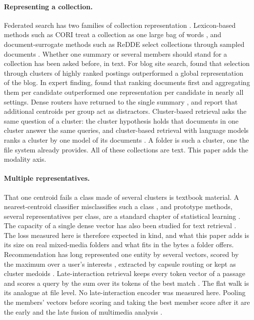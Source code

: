 \documentclass[sigconf,natbib=true,anonymous=true]{acmart}
\begin{document}
\paragraph{Representing a collection.} Federated search has two families of collection representation \citep{shokouhi2011federated}. Lexicon-based methods such as CORI treat a collection as one large bag of words \citep{callan1995cori}, and document-surrogate methods such as ReDDE select collections through sampled documents \citep{si2003redde}. Whether one summary or several members should stand for a collection has been asked before, in text. For blog site search, \citet{seo2008blogsite} found that selection through clusters of highly ranked postings outperformed a global representation of the blog. In expert finding, \citet{balog2006expert} found that ranking documents first and aggregating them per candidate outperformed one representation per candidate in nearly all settings. Dense routers have returned to the single summary \citep{dhasade2026ragroute,lee2025routerretriever}, and \citet{lee2025routerretriever} report that additional centroids per group act as distractors. Cluster-based retrieval asks the same question of a cluster: the cluster hypothesis \citep{voorhees1985cluster} holds that documents in one cluster answer the same queries, and cluster-based retrieval with language models ranks a cluster by one model of its documents \citep{liu2004cluster,kurland2004corpus}. A folder is such a cluster, one the file system already provides. All of these collections are text. This paper adds the modality axis.

\paragraph{Multiple representatives.} That one centroid fails a class made of several clusters is textbook material. A nearest-centroid classifier misclassifies such a class \citep{manning2008iir}, and prototype methods, several representatives per class, are a standard chapter of statistical learning \citep{hastie2009esl}. The capacity of a single dense vector has also been studied for text retrieval \citep{luan2021sparse}. The loss measured here is therefore expected in kind, and what this paper adds is its size on real mixed-media folders and what fits in the bytes a folder offers. Recommendation has long represented one entity by several vectors, scored by the maximum over a user's interests \citep{weston2013maxmf}, extracted by capsule routing \citep{li2019mind} or kept as cluster medoids \citep{pal2020pinnersage}. Late-interaction retrieval keeps every token vector of a passage and scores a query by the sum over its tokens of the best match \citep{khattab2020colbert}. The flat walk is its analogue at file level. No late-interaction encoder was measured here. Pooling the members' vectors before scoring and taking the best member score after it are the early and the late fusion of multimedia analysis \citep{snoek2005fusion}.
\end{document}
